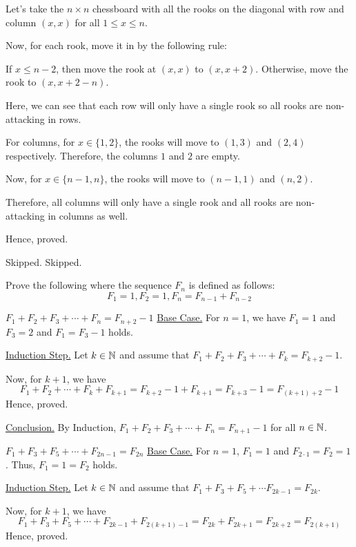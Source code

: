 Let's take the $n \times n$ chessboard with all the rooks on the diagonal with row and column $(x, x)$ for all $1 \leq x \leq n$.

Now, for each rook, move it in by the following rule:

If $x \leq n-2$, then move the rook at $(x, x)$ to $(x, x+2)$. 
Otherwise, move the rook to $(x, x+2-n)$.

Here, we can see that each row will only have a single rook so all rooks are non-attacking in rows.

For columns, for $x \in \{1, 2\}$, the rooks will move to $(1, 3)$ and $(2, 4)$ respectively.
Therefore, the columns $1$ and $2$ are empty.

Now, for $x \in \{n-1, n\}$, the rooks will move to $(n-1, 1)$ and $(n, 2)$.

Therefore, all columns will only have a single rook and all rooks are non-attacking in columns as well.

Hence, proved.
\es

\bp Skipped. \ep
\bp Skipped. \ep

\bp Prove the following where the sequence $F_n$ is defined as follows:
$$F_1 = 1, F_2 = 1, F_n = F_{n-1} + F_{n-2}$$

\bnum[(a)]
\item $F_1 + F_2 + F_3 + \cdots + F_n = F_{n+2} - 1$
	\bs
	\underline{Base Case.} For $n = 1$, we have $F_1 = 1$ and $F_3 = 2$ and $F_1 = F_3 - 1$ holds.

	\underline{Induction Step.} Let $k \in \mathbb{N}$ and assume that $F_1 + F_2 + F_3 + \cdots + F_k = F_{k+2} - 1$.

	Now, for $k+1$, we have
	$$F_1 + F_2 + \cdots + F_k + F_{k+1} = F_{k+2} - 1 + F_{k+1} = F_{k+3} - 1 = F_{(k+1)+2} - 1$$
	Hence, proved.

	\underline{Conclusion.} By Induction, $F_1 + F_2 + F_3 + \cdots + F_n = F_{n+1} - 1$ for all $n \in \mathbb{N}$.
	\es


\item $F_1 + F_3 + F_5 + \cdots + F_{2n-1} = F_{2n}$
	\bs
	\underline{Base Case.} For $n = 1$, $F_1 = 1$ and $F_{2 \cdot 1} = F_2 = 1$. Thus, $F_1 = 1 = F_2$ holds.

	\underline{Induction Step.} Let $k \in \mathbb{N}$ and assume that $F_1 + F_3 + F_5 + \cdots F_{2k-1} = F_{2k}$.

	Now, for $k+1$, we have
	$$F_1 + F_3 + F_5 + \cdots + F_{2k-1} + F_{2(k+1)-1}
		= F_{2k} + F_{2k+1} = F_{2k+2} = F_{2(k+1)}$$
	Hence, proved.

